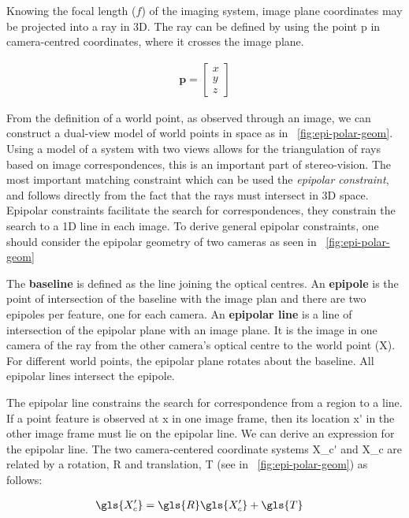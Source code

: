 Knowing the focal length (\(f\)) of the imaging system, image plane coordinates may be projected into a ray in 3D.
The ray can be defined by using the point \gls{p} in camera-centred coordinates, where it crosses the image plane.

\begin{align}
  \mathbf{p} = \begin{bmatrix}
        x\\y\\z
      \end{bmatrix}
\end{align}

From the definition of a world point, as observed through an image, we can construct a dual-view model of world points in space as in \figurename~\ref{fig:epi-polar-geom}.
Using a model of a system with two views allows for the triangulation of rays based on image correspondences, this is an important part of stereo-vision.
The most important matching constraint which can be used the \emph{epipolar constraint}, and follows directly from the fact that the rays must intersect in 3D space.
Epipolar constraints facilitate the search for correspondences, they constrain the search to a 1D line in each image.
To derive general epipolar constraints, one should consider the epipolar geometry of two cameras as seen in \figurename~\ref{fig:epi-polar-geom}


The \textbf{baseline} is defined as the line joining the optical centres.
An \textbf{epipole} is the point of intersection of the baseline with the image plan and there are two epipoles per feature, one for each camera.
An \textbf{epipolar line} is a line of intersection of the epipolar plane with an image plane.
It is the image in one camera of the ray from the other camera’s optical centre to the world point (\gls{X}).
For different world points, the epipolar plane rotates about the baseline.
All epipolar lines intersect the epipole.

The epipolar line constrains the search for correspondence from a region to a line.
If a point feature is observed at \gls{x} in one image frame, then its location \gls{x'} in the other image frame must lie on the epipolar line.
We can derive an expression for the epipolar line.
The two camera-centered coordinate systems \gls{X_c'} and \gls{X_c} are related by a rotation, \gls{R} and translation, \gls{T} (see in \figurename~\ref{fig:epi-polar-geom}) as follows:

\begin{align}
    \gls{X_c'} &= \gls{R}\gls{X_c'} + \gls{T}
\end{align}

